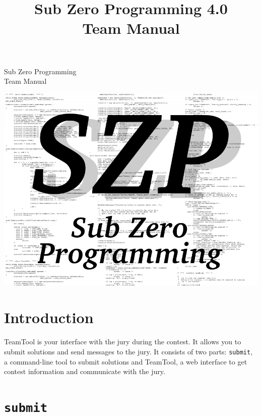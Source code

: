 \documentclass[a4paper]{artikel3}
\title{ Sub Zero Programming 4.0 \\ Team Manual }
\newcommand{\cmd}[1]{\texttt{#1}}
\begin{document}
\begin{titlepage}
\begin{center}

{\Huge Sub Zero Programming} \\

{\Huge Team Manual} \\
\vspace{5cm}

\includegraphics[width=160mm]{szplogo}

\end{center}
\end{titlepage}


\bigskip
\section{Introduction}

TeamTool is your interface with the jury during the contest. It allows you
to submit solutions and send messages to the jury. It consists of two parts:
\cmd{submit}, a command-line tool to submit solutions and TeamTool, a web
interface to get contest information and communicate with the jury.

\section{\cmd{submit}}

\label{sec:submit}
\end{document}
